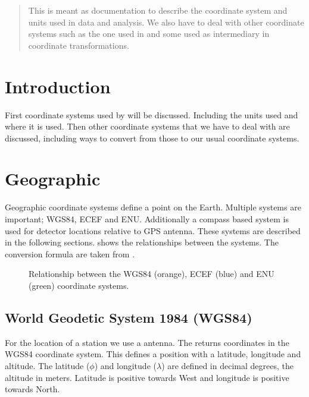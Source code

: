 \begin{abstract}

This is meant as documentation to describe the coordinate system and
units used in \hisparc data and analysis. We also have to deal with
other coordinate systems such as the one used in \corsika and some used
as intermediary in coordinate transformations.

\end{abstract}


\section{Introduction}

First coordinate systems used by \hisparc will be discussed. Including
the units used and where it is used. Then other coordinate systems that
we have to deal with are discussed, including ways to convert from those
to our usual coordinate systems.


\section{Geographic}

Geographic coordinate systems define a point on the Earth. Multiple
systems are important; WGS84, ECEF and ENU. Additionally a compass based
system is used for detector locations relative to GPS antenna. These
systems are described in the following sections.
 shows the relationships between the systems.
The conversion formula are taken from \cite{wikigeodetic}.

\begin{figure}
    \centering
    
    \caption{Relationship between the WGS84 (orange), ECEF (blue) and ENU
             (green) coordinate systems.}
    \label{fig:wgs84_ecef_enu}
\end{figure}


\subsection{World Geodetic System 1984 (WGS84)}

For the location of a station we use a \gps antenna. The \gps returns
coordinates in the WGS84 coordinate system. This defines a position with
a latitude, longitude and altitude. The latitude ($\phi$) and longitude
($\lambda$) are defined in decimal degrees, the altitude in meters.
Latitude is positive towards West and longitude is positive towards
North.


